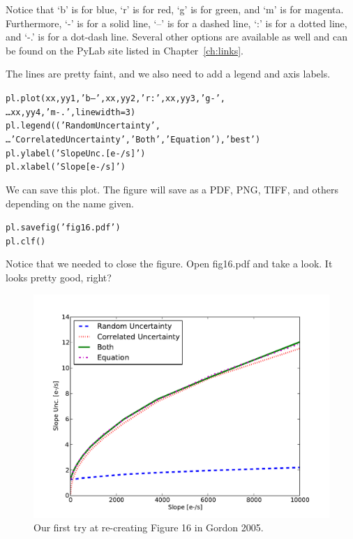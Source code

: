 Notice that `b' is for blue, `r' is for red, `g' is for green, and `m'
is for magenta.  Furthermore, `-' is for a solid line, `--' is for a
dashed line, `:' is for a dotted line, and `-.' is for a dot-dash
line.  Several other options are available as well and can be found on
the PyLab site listed in Chapter~\ref{ch:links}.

The lines are pretty faint, and we also need to add a legend and axis
labels.

\begin{alltt}
\pytab pl.plot(xx,yy1,'b--',xx,yy2,'r:',xx,yy3,'g-',  
\ldots      xx,yy4,'m-.',linewidth=3) 
\pytab pl.legend(('Random Uncertainty',  
\ldots      'Correlated Uncertainty', 'Both','Equation'),'best') 
\pytab pl.ylabel('Slope Unc. [e-/s]')
\pytab pl.xlabel('Slope [e-/s]')
\end{alltt}

We can save this plot.  The figure will save as a PDF, PNG, TIFF, and
others depending on the name given.

\begin{alltt}
\pytab pl.savefig('fig16.pdf')
\pytab pl.clf()
\end{alltt}

Notice that we needed to close the figure.  Open fig16.pdf and take a
look.  It looks pretty good, right?  

\begin{figure}[tbp]
  \centering
    \includegraphics[scale=0.55]{splot.pdf}
    \caption{Our first try at re-creating Figure 16 in Gordon 2005.}
  \label{fig:splot}
\end{figure}

